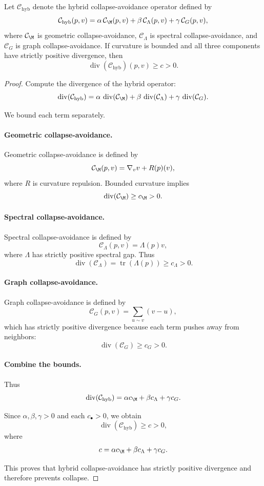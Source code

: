\begin{lemma}
Let $\mathcal{C}_{\mathrm{hyb}}$ denote the hybrid collapse-avoidance
operator defined by
\[
\mathcal{C}_{\mathrm{hyb}}(p,v)
=
\alpha\, \mathcal{C}_\M(p,v)
+
\beta\, \mathcal{C}_\Lambda(p,v)
+
\gamma\, \mathcal{C}_G(p,v),
\]
where $\mathcal{C}_\M$ is geometric collapse-avoidance, 
$\mathcal{C}_\Lambda$ is spectral collapse-avoidance, and 
$\mathcal{C}_G$ is graph collapse-avoidance.  
If curvature is bounded and all three components have strictly positive
divergence, then
\[
\operatorname{div}(\mathcal{C}_{\mathrm{hyb}})(p,v)
\ge c > 0.
\]
\end{lemma}

\begin{proof}
Compute the divergence of the hybrid operator:
\[
\operatorname{div}(\mathcal{C}_{\mathrm{hyb}})
=
\alpha\, \operatorname{div}(\mathcal{C}_\M)
+
\beta\, \operatorname{div}(\mathcal{C}_\Lambda)
+
\gamma\, \operatorname{div}(\mathcal{C}_G).
\]

We bound each term separately.

\paragraph{Geometric collapse-avoidance.}
Geometric collapse-avoidance is defined by
\[
\mathcal{C}_\M(p,v)
=
\nabla_v v + R(p)(v),
\]
where $R$ is curvature repulsion.  
Bounded curvature implies
\[
\operatorname{div}(\mathcal{C}_\M) \ge c_\M > 0.
\]

\paragraph{Spectral collapse-avoidance.}
Spectral collapse-avoidance is defined by
\[
\mathcal{C}_\Lambda(p,v)
=
\Lambda(p)v,
\]
where $\Lambda$ has strictly positive spectral gap.  
Thus
\[
\operatorname{div}(\mathcal{C}_\Lambda)
=
\operatorname{tr}(\Lambda(p))
\ge c_\Lambda > 0.
\]

\paragraph{Graph collapse-avoidance.}
Graph collapse-avoidance is defined by
\[
\mathcal{C}_G(p,v)
=
\sum_{u \sim v} (v - u),
\]
which has strictly positive divergence because each term pushes away from
neighbors:
\[
\operatorname{div}(\mathcal{C}_G)
\ge c_G > 0.
\]

\paragraph{Combine the bounds.}
Thus
\[
\operatorname{div}(\mathcal{C}_{\mathrm{hyb}})
=
\alpha c_\M + \beta c_\Lambda + \gamma c_G.
\]

Since $\alpha,\beta,\gamma > 0$ and each $c_\bullet > 0$, we obtain
\[
\operatorname{div}(\mathcal{C}_{\mathrm{hyb}}) \ge c > 0,
\]
where
\[
c = \alpha c_\M + \beta c_\Lambda + \gamma c_G.
\]

This proves that hybrid collapse-avoidance has strictly positive
divergence and therefore prevents collapse.
\end{proof}

